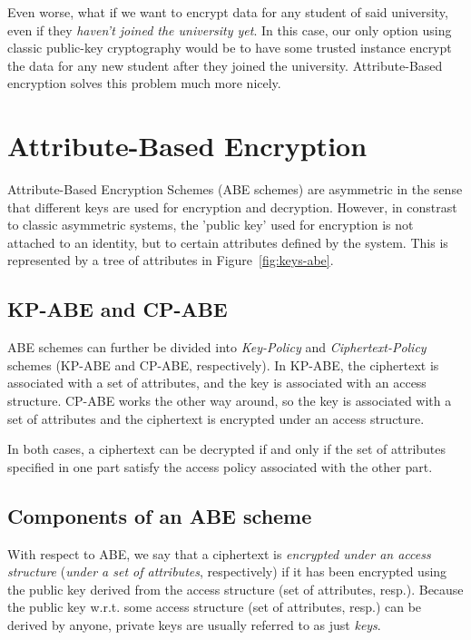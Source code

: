 Even worse, what if we want to encrypt data for any student of said university, even if they \emph{haven't joined the university yet}.
In this case, our only option using classic public-key cryptography would be to have some trusted instance encrypt the data for any new student after they joined the university.
Attribute-Based encryption solves this problem much more nicely. 

\section{Attribute-Based Encryption}

Attribute-Based Encryption Schemes (ABE schemes) are asymmetric in the sense that different keys are used for encryption and decryption.
However, in constrast to classic asymmetric systems, the 'public key' used for encryption is not attached to an identity, but to certain attributes defined by the system.
This is represented by a tree of attributes in Figure~\ref{fig:keys-abe}.


\subsection{KP-ABE and CP-ABE}
ABE schemes can further be divided into \emph{Key-Policy} and \emph{Ciphertext-Policy} schemes (KP-ABE and CP-ABE, respectively).
In KP-ABE, the ciphertext is associated with a set of attributes, and the key is associated with an access structure.
CP-ABE works the other way around, so the key is associated with a set of attributes and the ciphertext is encrypted under an access structure.

In both cases, a ciphertext can be decrypted if and only if the set of attributes specified in one part satisfy the access policy associated with the other part.



\subsection{Components of an ABE scheme}

With respect to ABE, we say that a ciphertext is \emph{encrypted under an access structure} (\emph{under a set of attributes}, respectively) if it has been encrypted using the public key derived from the access structure (set of attributes, resp.).
Because the public key w.r.t. some access structure (set of attributes, resp.) can be derived by anyone, private keys are usually referred to as just \emph{keys}.

